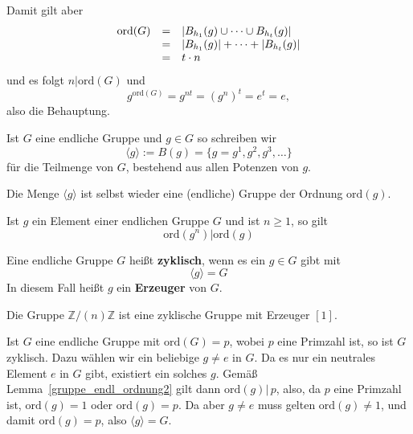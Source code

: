 Damit gilt aber 
  $$ \begin{array} {l c l}
     \textrm{ord}(G) & = & \vert B_{h_1}(g) \cup \cdots \cup B_{h_t}(g) \vert \\
   & = & \vert B_{h_1}(g) \vert +  \cdots + \vert B_{h_t}(g) \vert \\
   & = & t \cdot n 
  \end{array} $$
 und es folgt $n \vert \textrm{ord}(G)$ und 
  $$ g^{\textrm{ord}(G)} = g^{nt} = \left(g^n\right)^t = e^t = e,$$ 
also die Behauptung.

\medbreak

 Ist $G$ eine endliche Gruppe und $g \in G$ so schreiben wir
  	$$ \langle g \rangle := B(g) = \{ g = g^1, g^2, g^3, \ldots \} $$
für die Teilmenge von $G$, bestehend aus allen Potenzen von $g$.

\medbreak

\begin{notiz} Die Menge $\langle g \rangle$ ist selbst wieder eine (endliche) Gruppe der Ordnung
$\textrm{ord}(g)$.
\end{notiz}

\begin{notiz}\label{gruppe_endl_ordn_ele_pot} Ist $g$ ein Element einer endlichen Gruppe $G$ und ist $n \geq 1$, 
so gilt
  $$ \textrm{ord}(g^n) \vert  \textrm{ord}(g) $$
\end{notiz}


\bigbreak

\begin{definition} Eine endliche Gruppe $G$ heißt 
\textbf{zyklisch}, wenn es ein $g \in G$ gibt mit 
  	$$ \langle g \rangle = G $$
In diesem Fall heißt $g$ ein \textbf{Erzeuger} von $G$.
\end{definition}

\begin{beispiel} Die Gruppe $\mathbb Z/(n) \mathbb Z$ ist eine zyklische Gruppe mit Erzeuger $[1]$.
\end{beispiel}

\begin{notiz} Ist $G$ eine endliche Gruppe mit $\textrm{ord}(G) = p$, wobei $p$ eine Primzahl ist, 
so ist $G$ zyklisch. Dazu wählen wir ein beliebige $g \neq e$ in $G$. Da es nur ein neutrales 
Element $e$ in $G$ gibt, existiert ein solches $g$. Gemäß Lemma~\ref{gruppe_endl_ordnung2} gilt 
dann $\textrm{ord}(g) \vert \, p$, also, da $p$ eine Primzahl ist, $\textrm{ord}(g) = 1$ oder 
$\textrm{ord}(g) = p$. Da aber $g \neq e$ muss gelten $\textrm{ord}(g) \neq 1$, und damit $\textrm{ord}(g) 
= p$, also $\langle g \rangle = G$.
\end{notiz}

